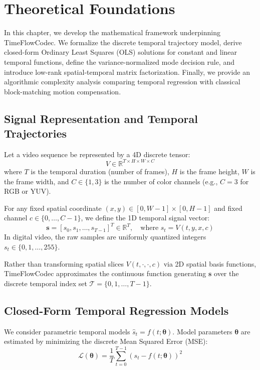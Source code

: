 \chapter{Theoretical Foundations}
\label{chap:theory}

In this chapter, we develop the mathematical framework underpinning TimeFlowCodec. We formalize the discrete temporal trajectory model, derive closed-form Ordinary Least Squares (OLS) solutions for constant and linear temporal functions, define the variance-normalized mode decision rule, and introduce low-rank spatial-temporal matrix factorization. Finally, we provide an algorithmic complexity analysis comparing temporal regression with classical block-matching motion compensation.

\section{Signal Representation and Temporal Trajectories}
Let a video sequence be represented by a 4D discrete tensor:
\begin{equation}
    V \in \mathbb{R}^{T \times H \times W \times C}
\end{equation}
where $T$ is the temporal duration (number of frames), $H$ is the frame height, $W$ is the frame width, and $C \in \{1, 3\}$ is the number of color channels (e.g., $C=3$ for RGB or YUV).

For any fixed spatial coordinate $(x, y) \in [0, W-1] \times [0, H-1]$ and fixed channel $c \in \{0, \dots, C-1\}$, we define the 1D temporal signal vector:
\begin{equation}
    \mathbf{s} = [s_0, s_1, \dots, s_{T-1}]^T \in \mathbb{R}^T, \quad \text{where } s_t = V(t, y, x, c)
\end{equation}
In digital video, the raw samples are uniformly quantized integers $s_t \in \{0, 1, \dots, 255\}$.

Rather than transforming spatial slices $V(t, \cdot, \cdot, c)$ via 2D spatial basis functions, TimeFlowCodec approximates the continuous function generating $\mathbf{s}$ over the discrete temporal index set $\mathcal{T} = \{0, 1, \dots, T-1\}$.

\section{Closed-Form Temporal Regression Models}
We consider parametric temporal models $\hat{s}_t = f(t; \mathbf{\theta})$. Model parameters $\mathbf{\theta}$ are estimated by minimizing the discrete Mean Squared Error (MSE):
\begin{equation}
    \mathcal{L}(\mathbf{\theta}) = \frac{1}{T} \sum_{t=0}^{T-1} (s_t - f(t; \mathbf{\theta}))^2
\end{equation}

